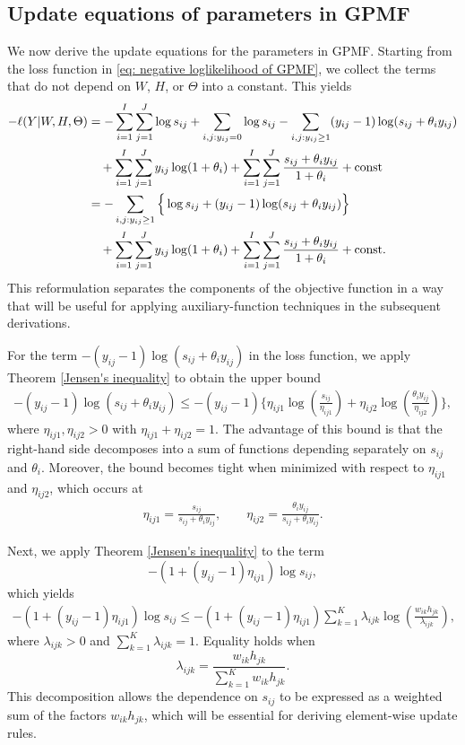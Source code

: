 \documentclass[pdflatex,sn-basic]{sn-jnl}%
\theoremstyle{thmstyleone}%
\theoremstyle{thmstyletwo}%
\theoremstyle{thmstylethree}%
\begin{document}
\subsection{Update equations of parameters in GPMF}
We now derive the update equations for the parameters in GPMF.  
Starting from the loss function in \eqref{eq: negative loglikelihood of GPMF}, we collect the terms that do not depend on $W$, $H$, or $\Theta$ into a constant.  
This yields
\begin{align}
	-\ell(Y|W,H,\Theta)
	&= -\sum_{i=1}^{I}\sum_{j=1}^{J}\log s_{ij}
	   + \sum_{i,j:y_{ij}=0}\log s_{ij}
	   - \sum_{i,j:y_{ij}\ge 1}(y_{ij}-1)\log\!\left(s_{ij}+\theta_i y_{ij}\right) \notag\\
	&\quad + \sum_{i=1}^{I}\sum_{j=1}^{J}y_{ij}\log(1+\theta_i)
	   + \sum_{i=1}^{I}\sum_{j=1}^{J}\frac{s_{ij}+\theta_i y_{ij}}{1+\theta_i}
	   + \mathrm{const} \notag\\
	&= -\sum_{i,j:y_{ij}\ge 1}\Big\{\log s_{ij}+(y_{ij}-1)\log(s_{ij}+\theta_i y_{ij})\Big\} \notag\\
	&\quad + \sum_{i=1}^{I}\sum_{j=1}^{J}y_{ij}\log(1+\theta_i)
	   + \sum_{i=1}^{I}\sum_{j=1}^{J}\frac{s_{ij}+\theta_i y_{ij}}{1+\theta_i}
	   + \mathrm{const.}
\end{align}
This reformulation separates the components of the objective function in a way that will be useful for applying auxiliary-function techniques in the subsequent derivations.

For the term $-(y_{ij}-1)\log(s_{ij}+\theta_i y_{ij})$ in the loss function,  
we apply Theorem \ref{Jensen's inequality} to obtain the upper bound
\begin{align}
	-(y_{ij}-1)\log(s_{ij}+\theta_i y_{ij})
	\le -(y_{ij}-1)\Bigg\{\eta_{ij1}\log\!\left(\frac{s_{ij}}{\eta_{ij1}}\right)
	+ \eta_{ij2}\log\!\left(\frac{\theta_i y_{ij}}{\eta_{ij2}}\right)\Bigg\},
\end{align}
where $\eta_{ij1},\eta_{ij2}>0$ with $\eta_{ij1}+\eta_{ij2}=1$.  
The advantage of this bound is that the right-hand side decomposes into a sum of functions depending separately on $s_{ij}$ and $\theta_i$.  
Moreover, the bound becomes tight when minimized with respect to $\eta_{ij1}$ and $\eta_{ij2}$, which occurs at
\begin{align*}
	\eta_{ij1} = \frac{s_{ij}}{s_{ij}+\theta_i y_{ij}}, 
	\qquad
	\eta_{ij2} = \frac{\theta_i y_{ij}}{s_{ij}+\theta_i y_{ij}}.
\end{align*}

Next, we apply Theorem \ref{Jensen's inequality} to the term 
\[
	-\left(1+(y_{ij}-1)\eta_{ij1}\right)\log s_{ij},
\]
which yields
\begin{align}
	-\left(1+(y_{ij}-1)\eta_{ij1}\right)\log s_{ij}
	\le -\left(1+(y_{ij}-1)\eta_{ij1}\right)
	\sum_{k=1}^{K}\lambda_{ijk}\log\!\left(\frac{w_{ik}h_{jk}}{\lambda_{ijk}}\right),
\end{align}
where $\lambda_{ijk}>0$ and $\sum_{k=1}^{K}\lambda_{ijk}=1$.  
Equality holds when
\[
	\lambda_{ijk}=\frac{w_{ik}h_{jk}}{\sum_{k=1}^{K}w_{ik}h_{jk}}.
\]
This decomposition allows the dependence on $s_{ij}$ to be expressed as a weighted sum of the factors $w_{ik}h_{jk}$, which will be essential for deriving element-wise update rules.
\end{document}
